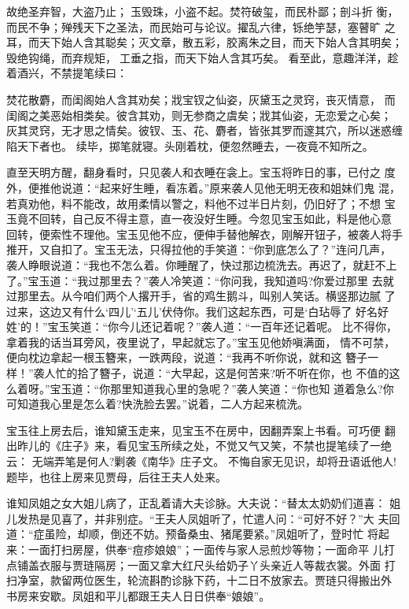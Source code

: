 故绝圣弃智，大盗乃止；玉毁珠，小盗不起。焚符破玺，而民朴鄙；剖斗折
衡，而民不争；殚残天下之圣法，而民始可与论议。擢乱六律，铄绝竽瑟，塞瞽旷
之耳，而天下始人含其聪矣；灭文章，散五彩，胶离朱之目，而天下始人含其明矣；
毁绝钩绳，而弃规矩，工垂之指，而天下始人含其巧矣。
看至此，意趣洋洋，趁着酒兴，不禁提笔续曰：

焚花散麝，而闺阁始人含其劝矣；戕宝钗之仙姿，灰黛玉之灵窍，丧灭情意，
而闺阁之美恶始相类矣。彼含其劝，则无参商之虞矣；戕其仙姿，无恋爱之心矣；
灰其灵窍，无才思之情矣。彼钗、玉、花、麝者，皆张其罗而邃其穴，所以迷惑缠
陷天下者也。
续毕，掷笔就寝。头刚着枕，便忽然睡去，一夜竟不知所之。

直至天明方醒，翻身看时，只见袭人和衣睡在衾上。宝玉将昨日的事，已付之
度外，便推他说道：“起来好生睡，看冻着。”原来袭人见他无明无夜和姐妹们鬼
混，若真劝他，料不能改，故用柔情以警之，料他不过半日片刻，仍旧好了；不想
宝玉竟不回转，自己反不得主意，直一夜没好生睡。今忽见宝玉如此，料是他心意
回转，便索性不理他。宝玉见他不应，便伸手替他解衣，刚解开钮子，被袭人将手
推开，又自扣了。宝玉无法，只得拉他的手笑道：“你到底怎么了？”连问几声，
袭人睁眼说道：“我也不怎么着。你睡醒了，快过那边梳洗去。再迟了，就赶不上
了。”宝玉道：“我过那里去？”袭人冷笑道：“你问我，我知道吗?你爱过那里
去就过那里去。从今咱们两个人撂开手，省的鸡生鹅斗，叫别人笑话。横竖那边腻
了过来，这边又有什么‘四儿’‘五儿’伏侍你。我们这起东西，可是‘白玷辱了
好名好姓’的！”宝玉笑道：“你今儿还记着呢？”袭人道：“一百年还记着呢。
比不得你，拿着我的话当耳旁风，夜里说了，早起就忘了。”宝玉见他娇嗔满面，
情不可禁，便向枕边拿起一根玉簪来，一跌两段，说道：“我再不听你说，就和这
簪子一样！”袭人忙的拾了簪子，说道：“大早起，这是何苦来?听不听在你，也
不值的这么着呀。”宝玉道：“你那里知道我心里的急呢？”袭人笑道：“你也知
道着急么?你可知道我心里是怎么着?快洗脸去罢。”说着，二人方起来梳洗。

宝玉往上房去后，谁知黛玉走来，见宝玉不在房中，因翻弄案上书看。可巧便
翻出昨儿的《庄子》来，看见宝玉所续之处，不觉又气又笑，不禁也提笔续了一绝
云：
无端弄笔是何人?剿袭《南华》庄子文。
不悔自家无见识，却将丑语诋他人!
题毕，也往上房来见贾母，后往王夫人处来。

谁知凤姐之女大姐儿病了，正乱着请大夫诊脉。大夫说：“替太太奶奶们道喜：
姐儿发热是见喜了，并非别症。“王夫人凤姐听了，忙遣人问：“可好不好？”大
夫回道：“症虽险，却顺，倒还不妨。预备桑虫、猪尾要紧。”凤姐听了，登时忙
将起来：一面打扫房屋，供奉“痘疹娘娘”；一面传与家人忌煎炒等物；一面命平
儿打点铺盖衣服与贾琏隔房；一面又拿大红尺头给奶子丫头亲近人等裁衣裳。外面
打扫净室，款留两位医生，轮流斟酌诊脉下药，十二日不放家去。贾琏只得搬出外
书房来安歇。凤姐和平儿都跟王夫人日日供奉“娘娘”。

